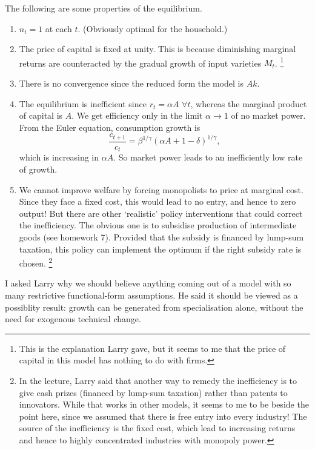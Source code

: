 \documentclass[11pt,letterpaper,reqno,oneside]{article}
\begin{document}
The following are some properties of the equilibrium.
%
\begin{enumerate}

	\item $n_t = 1$ at each $t$. (Obviously optimal for the household.)

	\item The price of capital is fixed at unity. This is because diminishing marginal returns are counteracted by the gradual growth of input varieties $M_t$.%
		\footnote{This is the explanation Larry gave, but it seems to me that the price of capital in this model has nothing to do with firms.}

	\item There is no convergence since the reduced form the model is $Ak$.

	\item The equilibrium is inefficient since $r_t = \alpha A$ $\forall t$, whereas the marginal product of capital is $A$. We get efficiency only in the limit $\alpha \to 1$ of no market power. From the Euler equation, consumption growth is
	\begin{equation*}
		\frac{c_{t+1}}{c_t}
		= \beta^{1/\gamma} \left( \alpha A + 1 - \delta \right)^{1/\gamma} ,
	\end{equation*}
	which is increasing in $\alpha A$. So market power leads to an inefficiently low rate of growth.

	\item We cannot improve welfare by forcing monopolists to price at marginal cost. Since they face a fixed cost, this would lead to no entry, and hence to zero output! But there are other `realistic' policy interventions that could correct the inefficiency. The obvious one is to subsidise production of intermediate goods (see homework 7). Provided that the subsidy is financed by lump-sum taxation, this policy can implement the optimum if the right subsidy rate is chosen.%
		\footnote{In the lecture, Larry said that another way to remedy the inefficiency is to give cash prizes (financed by lump-sum taxation) rather than patents to innovators. While that works in other models, it seems to me to be beside the point here, since we assumed that there is free entry into every industry! The source of the inefficiency is the fixed cost, which lead to increasing returns and hence to highly concentrated industries with monopoly power.}

\end{enumerate}


I asked Larry why we should believe anything coming out of a model with so many restrictive functional-form assumptions. He said it should be viewed as a possiblity result: growth can be generated from specialisation alone, without the need for exogenous technical change.
\end{document}
